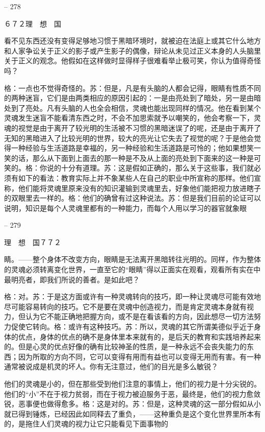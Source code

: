 \documentclass[11pt,oneside]{book}
\begin{document}
\begin{common-format}
    

-- 278

    ６７２理　想　国

    看不见东西还没有变得足够地习惯于黑暗环境时，就被迫在法庭上或其它什么地方和人家争讼关于正义的影子或产生影子的偶像，辩论从未见过正义本身的人头脑里关于正义的观念。他假如在这样做时显得样子很难看举止极可笑，你认为值得奇怪吗？

    格：一点也不觉得奇怪的。苏：但是，凡是有头脑的人都会记得，眼睛有性质不同的两种迷盲，它们是由两类相应的原因引起的：一是由亮处到了暗处，另一是由暗处到了亮处。凡有头脑的人也全会相信，灵魂也能出现同样的情况。他在看到某个灵魂发生迷盲不能看清东西之时，不会不加思索就予以嘲笑的，他会考察一下，灵魂的视觉是由于离开了较光明的生活被不习惯的黑暗迷误了的呢，还是由于离开了无知的黑暗进入了比较光明的世界，较大的亮光让它失去了视觉的呢？于是他会觉得一种经验与生活道路是幸福的，另一种经验和生活道路是可怜的；他如果想笑一笑的话，那么从下面到上面去的那一种是不及从上面的亮处到下面来的这一种是可笑的。格：你说的十分有道理。苏：这是假如正确的，那么关于这些事，我们就必须有如下的看法：教育实际上并不象某些人在自己的职业中所宣称的那样。他们宣称，他们能将灵魂里原来没有的知识灌输到灵魂里去，好象他们能把视力放进瞎子的双眼里去一样的。格：他们的确曾有过这种说法。苏：但是我们目前的论证可以说明，知识是每个人灵魂里都有的一种能力，而每个人用以学习的器官就象眼

    

-- 279

    理　想　国７７２

    睛。——整个身体不改变方向，眼睛是无法离开黑暗转往光明的。同样，作为整体的灵魂必须转离变化世界，一直至它的“眼睛”得以正面实在观看，观看所有实在中最明亮者，即我们所说的善者。是如此吧？

    格：对。苏：于是这方面或许有一种灵魂转向的技巧，即一种让灵魂尽可能有效地尽可能容易转向的技巧。它不是要在灵魂中创造视力，而是肯定灵魂本身就有视力，但认为它不能正确地把握方向，或不是在看该看的方向，因此想尽一切方法努力促使它转向。格：或许有这种技巧。苏：所以，灵魂的其它所谓美德似乎近于身体的优点，身体的优点的确不是身体里本来就有的，是后天的教育和实践培养起来的。但是心灵的优点好像的确有比较神圣的性质，是一种永远不会丧失能力的东西；因为所取的方向不同，它可以变得有用而有益也可以变得无用而有害。有一种通常被说成是机灵的坏人。你有无注意过，他们的目光是多么敏锐？

    他们的灵魂是小的，但在那些受到他们注意的事情上，他们的视力是十分尖锐的。他们的“小”不在于视力贫弱，而在于视力被迫服务于恶，最终是，他们的视力愈敛锐，恶事便也做得愈多。格：这是对的。苏：但是，这种灵魂的这一部分假如从小就已得到锤炼，已经因此如同释去了重负，——这种重负是这个变化世界里所本有的，是拖住人们灵魂的视力让它只能看见下面事物的


\end{common-format}
\end{document}

